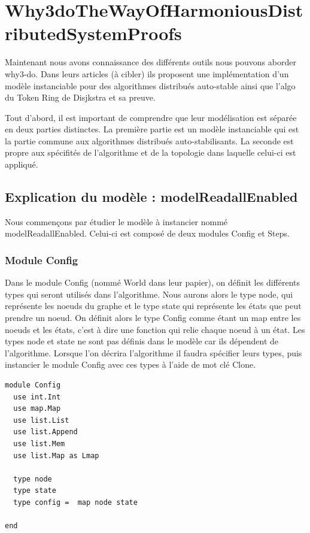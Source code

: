\documentclass[11pt]{article}
\begin{document}
\section{Why3doTheWayOfHarmoniousDistributedSystemProofs}
\label{sec:org90d71f5}

Maintenant nous avons connaissance des différents outils nous pouvons aborder why3-do.
Dans leurs articles (à cibler) ils proposent une implémentation d'un modèle instanciable pour des algorithmes
distribués auto-stable ainsi que l'algo du Token Ring de Disjkstra et sa preuve.


Tout d'abord, il est important de comprendre que leur modélisation est séparée en deux parties distinctes. 
La première partie est un modèle instanciable qui est la partie commune aux algorithmes distribués
auto-stabilisants. 
La seconde est propre aux spécifités de l'algorithme et de la topologie dans laquelle celui-ci est appliqué. 


\subsection{Explication du modèle : modelReadallEnabled}
\label{sec:org2e64b80}

Nous commençons par étudier le modèle à instancier nommé modelReadallEnabled.
Celui-ci est composé de deux modules Config et Steps.


\subsubsection{Module Config}
\label{sec:orgbbd047f}

Dans le module Config (nommé World dans leur papier), on définit les différents types qui seront utilisés dans l'algorithme.
Nous aurons alors le type node, qui représente les noeuds du graphe et le type state qui représente les états que peut prendre un noeud.
On définit alors le type Config comme étant un map entre les noeuds et les états, c'est à dire une fonction qui relie chaque noeud à un état.
Les types node et state ne sont pas définis dans le modèle car ils dépendent de l'algorithme. 
Lorsque l'on décrira l'algorithme il faudra spécifier leurs types, puis instancier le module Config avec ces types à l'aide de mot clé Clone. 

\lstset{language=why3,label= ,caption= ,captionpos=b,numbers=none}
\begin{lstlisting}
module Config
  use int.Int
  use map.Map
  use list.List
  use list.Append
  use list.Mem
  use list.Map as Lmap

  type node
  type state
  type config =  map node state

end

\end{lstlisting}
\end{document}
